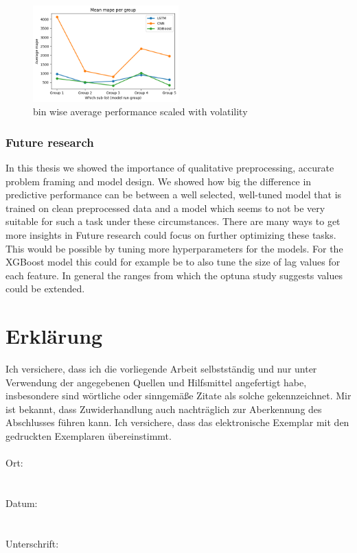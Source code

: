 \documentclass[a4paper,12pt]{report}
\begin{document}
\begin{figure}[htbp]
  \centering
  \includegraphics[width=0.5\textwidth]{images/averages_rescaled.png}
  \caption{bin wise average performance scaled with volatility}
  \label{fig:fullwidth}
\end{figure}



\subsection*{Future research}

In this thesis we showed the importance of qualitative preprocessing, accurate problem framing and model design. We showed how big the difference in predictive performance can be between a well selected, well-tuned model that is trained on clean preprocessed data and a model which seems to not be very suitable for such a task under these circumstances. There are many ways to get more insights in Future research could focus on further optimizing these tasks. This would be possible by tuning more hyperparameters for the models. For the XGBoost model this could for example be to also tune the size of lag values for each feature. In general the ranges from which the optuna study suggests values could be extended. 


\printbibliography






\chapter*{Erklärung}

Ich versichere, dass ich die vorliegende Arbeit selbstständig und nur unter Verwendung der
angegebenen Quellen und Hilfsmittel angefertigt habe, insbesondere sind wörtliche oder
sinngemäße Zitate als solche gekennzeichnet. Mir ist bekannt, dass Zuwiderhandlung auch
nachträglich zur Aberkennung des Abschlusses führen kann.
Ich versichere, dass das elektronische Exemplar mit den gedruckten Exemplaren übereinstimmt.\\\\

Ort:\\\\\\

Datum:\\\\\\

Unterschrift:
\end{document}
